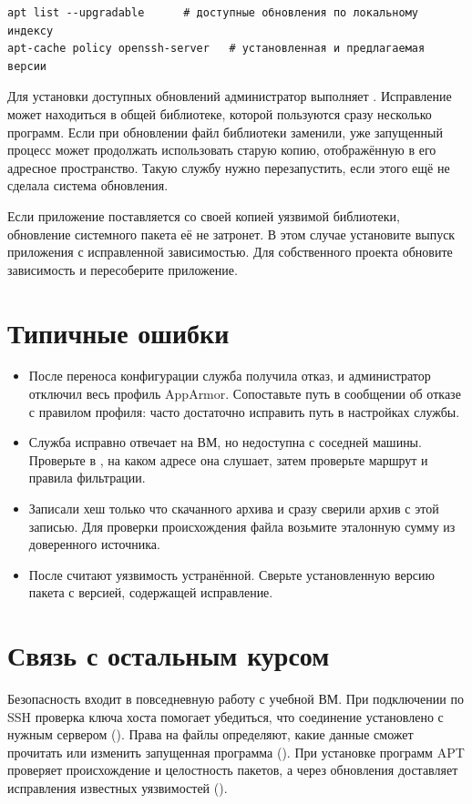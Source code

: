 \begin{verbatim}
apt list --upgradable      # доступные обновления по локальному индексу
apt-cache policy openssh-server   # установленная и предлагаемая версии
\end{verbatim}

Для установки доступных обновлений администратор выполняет
. Исправление может находиться в общей библиотеке,
которой пользуются сразу несколько программ. Если при обновлении файл
библиотеки заменили, уже запущенный процесс может продолжать использовать
старую копию, отображённую в его адресное пространство. Такую службу
нужно перезапустить, если этого ещё не сделала система обновления.

Если приложение поставляется со своей копией уязвимой библиотеки,
обновление системного пакета её не затронет. В этом случае установите
выпуск приложения с исправленной зависимостью. Для собственного проекта
обновите зависимость и пересоберите приложение.

\section{Типичные ошибки}
\begin{itemize}
  \item После переноса конфигурации служба получила отказ, и администратор
    отключил весь профиль AppArmor. Сопоставьте путь в сообщении об отказе
    с правилом профиля: часто достаточно исправить путь в настройках службы.
  \item Служба исправно отвечает на ВМ, но недоступна с соседней
    машины. Проверьте в , на каком адресе она слушает,
    затем проверьте маршрут и правила фильтрации.
  \item Записали хеш только что скачанного архива и сразу сверили архив
    с этой записью. Для проверки происхождения файла возьмите эталонную
    сумму из доверенного источника.
  \item После  считают уязвимость устранённой.
    Сверьте установленную версию пакета с версией, содержащей исправление.
\end{itemize}

\section{Связь с остальным курсом}

Безопасность входит в повседневную работу с учебной ВМ. При подключении
по SSH проверка ключа хоста помогает убедиться, что соединение установлено
с нужным сервером (). Права на файлы определяют,
какие данные сможет прочитать или изменить запущенная программа
(). При установке программ APT проверяет
происхождение и целостность пакетов, а через обновления доставляет
исправления известных уязвимостей ().

